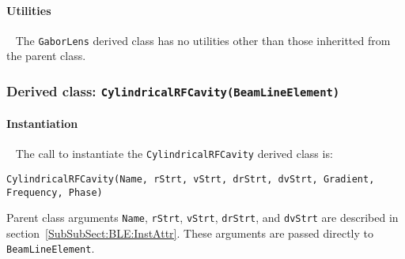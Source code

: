 \paragraph{Utilities} ~\newline
\noindent
The \texttt{GaborLens} derived class has no utilities other
than those inheritted from the parent class. 

\FloatBarrier

\subsubsection{Derived class: \texttt{CylindricalRFCavity(BeamLineElement)}}

\paragraph{Instantiation} ~\newline
\noindent
The call to instantiate the \texttt{CylindricalRFCavity} derived class is:
\begin{center}
  \texttt{CylindricalRFCavity(Name, rStrt, vStrt, drStrt, dvStrt,
          Gradient, Frequency, Phase)}
\end{center}
Parent class arguments \texttt{Name}, \texttt{rStrt}, \texttt{vStrt},
\texttt{drStrt}, and \texttt{dvStrt} are described in
section~\ref{SubSubSect:BLE:InstAttr}.
These arguments are passed directly to \texttt{BeamLineElement}.

